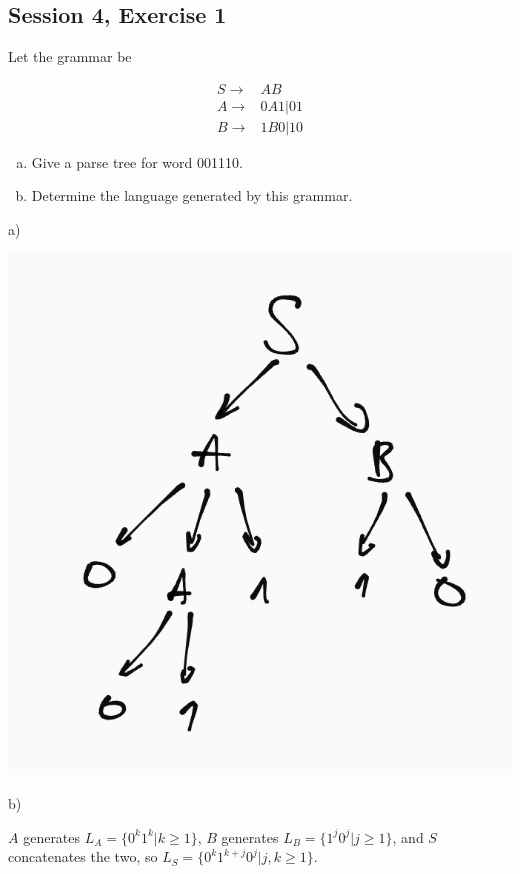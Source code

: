 \subsection{Session 4, Exercise 1}


Let the grammar be

\begin{align*}
S \rightarrow& AB\\
A \rightarrow& 0A1|01\\
B \rightarrow& 1B0|10
\end{align*}

\begin{enumerate}[(a)]
\item Give a parse tree for word 001110.
\item Determine the language generated by this grammar.
\end{enumerate}


a)

\includegraphics[width=0.5\linewidth]{04/4_1_a.png}


b)

$A$ generates $L_A = \{0^k1^k | k \geq{} 1\}$, $B$ generates $L_B = \{1^j0^j | j \geq{} 1\}$, and $S$ concatenates the two, so $L_S = \{0^k1^{k+j}0^j | j,k \geq{} 1\}$.